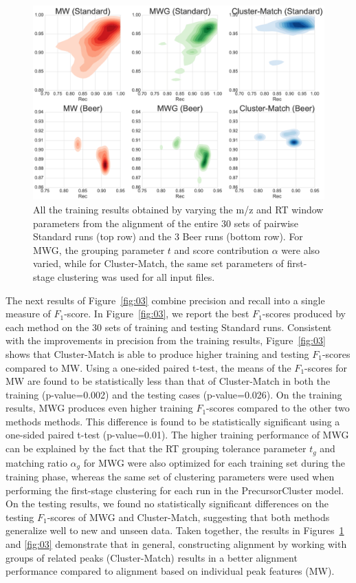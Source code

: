 \begin{figure}[!htbp]
\centering\includegraphics[width=1.0\linewidth]{05-precursor-cluster/figures/fig2.pdf}
\centering\caption{\label{fig:02} All the training results obtained by varying the m/z and RT window parameters from the alignment of the entire 30 sets of pairwise Standard runs (top row) and the 3 Beer runs (bottom row). For MWG, the grouping parameter $t$ and score contribution $\alpha$ were also varied, while for Cluster-Match, the same set parameters of first-stage clustering was used for all input files.}
\end{figure}

The next results of Figure~\ref{fig:03} combine precision and recall into a single measure of $F_1$-score. In Figure~\ref{fig:03}, we report the best $F_1$-scores produced by each method on the 30 sets of training and testing Standard runs. Consistent with the improvements in precision from the training results, Figure~\ref{fig:03} shows that Cluster-Match is able to produce higher training and testing $F_1$-scores compared to MW. Using a one-sided paired t-test, the means of the $F_1$-scores for MW are found to be statistically less than that of Cluster-Match in both the training (p-value=0.002) and the testing cases (p-value=0.026). On the training results, MWG produces even higher training $F_1$-scores compared to the other two methods methods. This difference is found to be statistically significant using a one-sided paired t-test (p-value=0.01). The higher training performance of MWG can be explained by the fact that the RT grouping tolerance parameter $t_g$ and matching ratio $\alpha_g$ for MWG were also optimized for each training set during the training phase, whereas the same set of clustering parameters were used when performing the first-stage clustering for each run in the PrecursorCluster model. On the testing results, we found no statistically significant differences on the testing $F_1$-scores of MWG and Cluster-Match, suggesting that both methods generalize well to new and unseen data. Taken together, the results in Figures~\ref{fig:02} and \ref{fig:03} demonstrate that in general, constructing alignment by working with groups of related peaks (Cluster-Match) results in a better alignment performance compared to alignment based on individual peak features (MW).

